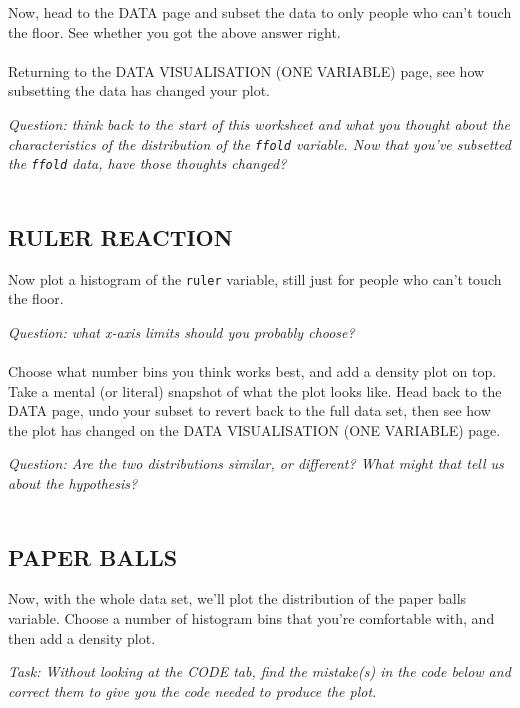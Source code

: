 \documentclass[
]{book}
\begin{document}
Now, head to the DATA page and subset the data to only people who can't touch the
floor. See whether you got the above answer right.\\
~\\

Returning to the DATA VISUALISATION (ONE VARIABLE) page, see how subsetting
the data has changed your plot.

\emph{Question: think back to the start of this worksheet and what you thought about
the characteristics of the distribution of the \texttt{ffold} variable. Now that you've subsetted the \texttt{ffold} data, have those thoughts changed?}\\
~\\

\hypertarget{ruler-reaction}{%
\subsection{RULER REACTION}\label{ruler-reaction}}

Now plot a histogram of the \texttt{ruler} variable, still just for people who can't
touch the floor.

\emph{Question: what x-axis limits should you probably choose?}\\
~\\

Choose what number bins you think works best, and add a
density plot on top. Take a mental (or literal) snapshot of what the plot looks
like. Head back to the DATA page, undo your subset to revert back to the full data set, then see how the plot has changed on the DATA VISUALISATION (ONE VARIABLE) page.

\emph{Question: Are the two distributions similar, or different? What might that tell
us about the hypothesis?}\\
~\\

\hypertarget{paper-balls}{%
\subsection{PAPER BALLS}\label{paper-balls}}

Now, with the whole data set, we'll plot the distribution of the paper balls
variable. Choose a number of histogram bins that you're comfortable with, and then add a density plot.

\emph{Task: Without looking at the CODE tab, find the mistake(s) in the code below
and correct them to give you the code needed to produce the plot.}
\end{document}
